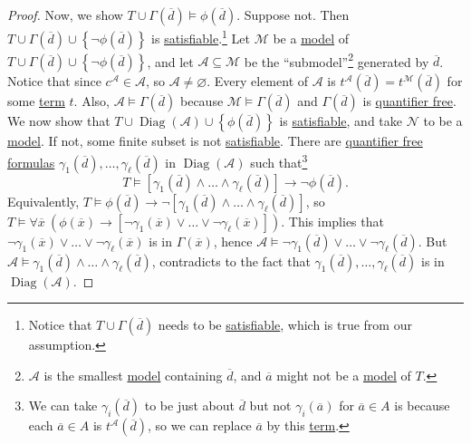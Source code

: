 \begin{proof}
	Now, we show \(T\cup \Gamma (\overline{d} ) \models \phi (\overline{d} )\). Suppose not. Then \(T \cup \Gamma (\overline{d} ) \cup \left\{ \lnot \phi (\overline{d} ) \right\} \) is \hyperref[def:satisfiable]{satisfiable}.\footnote{Notice that \(T \cup \Gamma (\overline{d} )\) needs to be \hyperref[def:satisfiable]{satisfiable}, which is true from our assumption.} Let \(\mathcal{M}\) be a \hyperref[def:model]{model} of \(T \cup \Gamma (\overline{d} ) \cup \left\{ \lnot \phi (\overline{d} ) \right\} \), and let \(\mathcal{A} \subseteq \mathcal{M} \) be the ``submodel''\footnote{\(\mathcal{A} \) is the smallest \hyperref[def:model]{model} containing \(\overline{d} \), and \(\overline{a} \) might not be a \hyperref[def:model]{model} of \(T\).} generated by \(\overline{d} \). Notice that since \(c^{\mathcal{A} } \in \mathcal{A} \), so \(\mathcal{A} \neq \varnothing \). Every element of \(\mathcal{A} \) is \(t^{\mathcal{A} }(\overline{d} ) = t^{\mathcal{M} }(\overline{d} ) \) for some \hyperref[def:term]{term} \(t\). Also, \(\mathcal{A} \models \Gamma (\overline{d} )\) because \(\mathcal{M} \models \Gamma (\overline{d} )\) and \(\Gamma (\overline{d} )\) is \hyperref[not:quantifier-free]{quantifier free}. We now show that \(T \cup \mathop{\mathrm{Diag}}(\mathcal{A} ) \cup \left\{ \phi (\overline{d} ) \right\} \) is \hyperref[def:satisfiable]{satisfiable}, and take \(\mathcal{N} \) to be a \hyperref[def:model]{model}. If not, some finite subset is not \hyperref[def:satisfiable]{satisfiable}. There are \hyperref[not:quantifier-free]{quantifier free} \hyperref[def:formula]{formulas} \(\gamma _1(\overline{d} ), \ldots , \gamma _\ell (\overline{d} )\) in \(\mathop{\mathrm{Diag}}(\mathcal{A} ) \) such that\footnote{We can take \(\gamma _i(\overline{d} )\) to be just about \(\overline{d} \) but not \(\gamma _i(\overline{a} )\) for \(\overline{a} \in A\) is because each \(\overline{a} \in A\) is \(t^{\mathcal{A} } (\overline{d} )\), so we can replace \(\overline{a} \) by this \hyperref[def:term]{term}.}
	\[
		T \models \left[ \gamma _1(\overline{d} ) \land \ldots \land \gamma _\ell (\overline{d} ) \right] \to \lnot \phi (\overline{d} ).
	\]
	Equivalently, \(T \models \phi (\overline{d} ) \to \lnot \left[ \gamma _1(\overline{d} ) \land \ldots \land \gamma _\ell (\overline{d} ) \right] \), so \(T \models \forall \overline{x}\ \left( \phi (\overline{x} ) \to \left[ \lnot \gamma _1(\overline{x} ) \lor \ldots \lor \lnot \gamma _\ell (\overline{x} ) \right]  \right) \). This implies that \(\lnot \gamma _1(\overline{x} ) \lor \ldots \lor \lnot \gamma _\ell (\overline{x} )\) is in \(\Gamma (\overline{x} )\), hence \(\mathcal{A} \models \lnot \gamma _1(\overline{d} ) \lor \ldots \lor \lnot \gamma _\ell (\overline{d} )\). But \(\mathcal{A} \models \gamma _1(\overline{d} ) \land \ldots \land \gamma _\ell (\overline{d} )\), contradicts to the fact that \(\gamma _1(\overline{d} ), \ldots , \gamma _\ell (\overline{d} )\) is in \(\mathop{\mathrm{Diag}}(\mathcal{A} ) \).


\end{proof}
